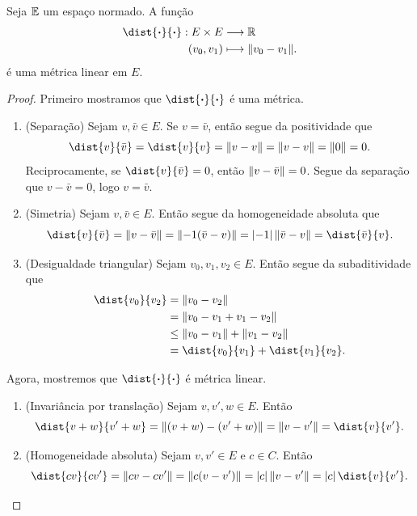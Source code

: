 \begin{prop}
Seja $\mathbb{E}$ um espaço normado. A função
	\begin{align*}
	\func{\dist{\var}{\var}}{E \times E}{\R}{(v_0,v_1)}{\nor{v_0 - v_1}}.
	\end{align*}
é uma métrica linear em $E$.
\end{prop}
\begin{proof}
Primeiro mostramos que $\dist{\var}{\var}$ é uma métrica.
	\begin{enumerate}
	\item (Separação) Sejam $v,\bar v \in E$. Se $v = \bar v$, então segue da positividade que
	\begin{equation*}
	\dist{v}{\bar v} = \dist{v}{v} = \nor{v - v} = \nor{v-v}=\nor{0}=0.
	\end{equation*}
Reciprocamente, se $\dist{v}{\bar v}=0$, então $\left\Vert{v-\bar v}\right\Vert=0$. Segue da separação que $v-\bar v=0$, logo $v=\bar v$.

	\item (Simetria)  Sejam $v,\bar v \in E$. Então segue da homogeneidade absoluta que
	\begin{equation*}
	\dist{v}{\bar v}=\nor{v-\bar v}=\nor{-1(\bar v -v)}=\abs{-1}\nor{\bar v - v}=\dist{\bar v}{v}.
	\end{equation*}
	
	\item (Desigualdade triangular) Sejam $v_0,v_1,v_2 \in E$. Então segue da subaditividade que
	\begin{align*}
	\dist{v_0}{v_2} &= \nor{v_0-v_2} \\
		&=\nor{v_0-v_1+v_1-v_2} \\
		&\leq \nor{v_0-v_1}+\nor{v_1-v_2} \\
		&=\dist{v_0}{v_1}+\dist{v_1}{v_2}.
	\end{align*}	
	\end{enumerate}
Agora, mostremos que $\dist{\var}{\var}$ é métrica linear.
	\begin{enumerate}
	\item (Invariância por translação) Sejam $v,v',w \in E$. Então
		\begin{equation*}
		\dist{v+w}{v'+w} = \nor{(v+w) - (v'+w)} = \nor{v-v'} = \dist{v}{v'}.
		\end{equation*}
	
	\item (Homogeneidade absoluta) Sejam $v,v' \in E$ e $c \in C$. Então
		\begin{equation*}
		\dist{cv}{cv'} = \nor{cv-cv'} = \nor{c(v-v')} = \abs{c}\nor{v-v'} = \abs{c}\dist{v}{v'}. \qedhere
		\end{equation*}
	\end{enumerate}
\end{proof}

